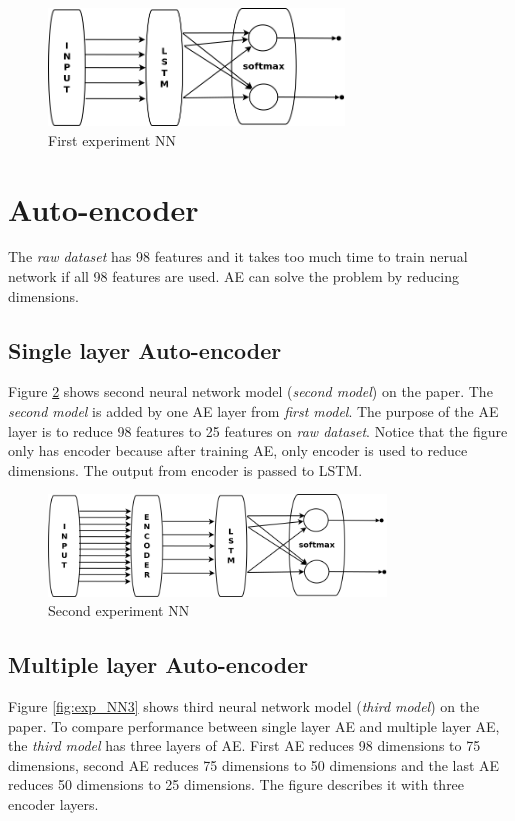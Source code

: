 \documentclass[draft,dvipsnames]{drexel-thesis}
\begin{document}
\begin{thesis}
\begin{figure}[t!]
    \centering
    \includegraphics[width=0.7\textwidth]{pictures/figures/exp_NN1.png}
    \caption{First experiment NN}
    \label{fig:exp_NN1}
\end{figure}


\section{Auto-encoder}
The {\em raw dataset} has 98 features and it takes too much time to train nerual network if all 98 features are used. AE can solve the problem by reducing dimensions.

\subsection{Single layer Auto-encoder}
Figure \ref{fig:exp_NN2} shows second neural network model ({\em second model}) on the paper. The {\em second model} is added by one AE layer from {\em first model}. The purpose of the AE layer is to reduce 98 features to 25 features on {\em raw dataset}. Notice that the figure only has encoder because after training AE, only encoder is used to reduce dimensions. The output from encoder is passed to LSTM.

\begin{figure}[t!]
    \centering
    \includegraphics[width=0.8\textwidth]{pictures/figures/exp_NN2.png}
    \caption{Second experiment NN}
    \label{fig:exp_NN2}
\end{figure}


\subsection{Multiple layer Auto-encoder}
Figure \ref{fig:exp_NN3} shows third neural network model ({\em third model}) on the paper. To compare performance between single layer AE and multiple layer AE, the {\em third model} has three layers of AE.  First AE reduces 98 dimensions to 75 dimensions, second AE reduces 75 dimensions to 50 dimensions and the last AE reduces 50 dimensions to 25 dimensions. The figure describes it with three encoder layers.


\end{thesis}
\end{document}
